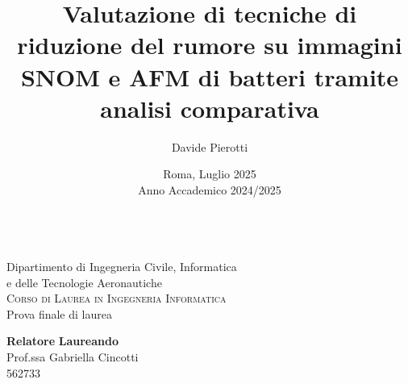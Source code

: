 \documentclass[a4paper, 11pt, italian, oneside]{book}
\author{Davide Pierotti}
\date{\normalsize Roma, Luglio 2025\\Anno Accademico 2024/2025}
\title{Valutazione di tecniche di riduzione del rumore su immagini SNOM e AFM di batteri tramite analisi comparativa}
\begin{document}

\frontmatter
\makeatletter

\begin{titlepage}
	\begin{center}
		\\[1cm]

		\large{Dipartimento di Ingegneria Civile, Informatica\\e delle Tecnologie Aeronautiche\\
		\textsc{Corso di Laurea in Ingegneria Informatica}}\\[2cm]

		\bigskip
		Prova finale di laurea
		\medskip

		\textbf{\LARGE\@title}

		\vspace{4 cm}

		\noindent \textbf{Relatore} \hfill \textbf{Laureando} \\
		\noindent Prof.ssa Gabriella Cincotti \hfill \@author \\
		\hfill 562733 \\

		\begin{bottompar}
			\@date
		\end{bottompar}

	\end{center}
\end{titlepage}

\makeatother




\pagestyle{plain}
\setcounter{page}{0}
\tableofcontents
\listoftables
\listoffigures


\mainmatter
{}
\pagestyle{headings}







\end{document}
